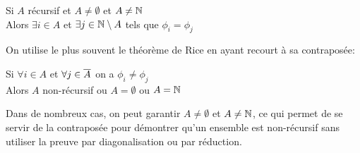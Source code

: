 \begin{mytheo}[Rice]
	Si $A$ récursif et $A\neq \emptyset$ et $A \neq \mathbb{N}$ \\
	Alors $\exists i \in A$ et $\exists j \in \mathbb{N} \setminus A$ tels que $\phi _i = \phi _j$
\end{mytheo}

On utilise le plus souvent le théorème de Rice en ayant recourt à sa contraposée:

\begin{mytheo}
	Si $\forall  i \in A$ et $\forall j \in \overline{A}$ on a $\phi_i \neq \phi_j$ \\
	Alors $A$ non-récursif ou $A = \emptyset$ ou $A = \mathbb{N}$
\end{mytheo}

Dans de nombreux cas, on peut garantir $A \neq \emptyset$ et $A \neq \mathbb{N}$, ce qui permet de se servir de la contraposée pour démontrer qu'un ensemble est non-récursif sans utiliser la preuve par diagonalisation ou par réduction.


